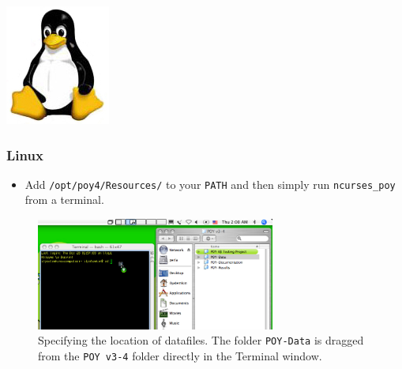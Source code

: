 \begin{flushleft}
	\begin{minipage}[c]{0.075\textwidth}
   		\includegraphics[width=\textwidth]{figures/figlogolinux.jpg}
	\end{minipage}
	\quad
	\begin{minipage}[t]{0.89\textwidth}
	   	\subsubsection{Linux}
	\end{minipage}
	\begin{itemize}
    		\item Add \texttt{/opt/poy4/Resources/} to your \texttt{PATH} and then simply run
    \texttt{ncurses\_poy} from a terminal.
    	\end{itemize}
\end{flushleft}

\begin{figure}[htbp]
   \centering
   \includegraphics[width=0.7\textwidth]{figures/figprelim1.jpg}
   \caption{Specifying the location of datafiles. The folder \texttt{POY-Data} is dragged from the \texttt{POY v3-4} folder directly in the Terminal window.}
   \label{fig:figprelim1}
\end{figure}

